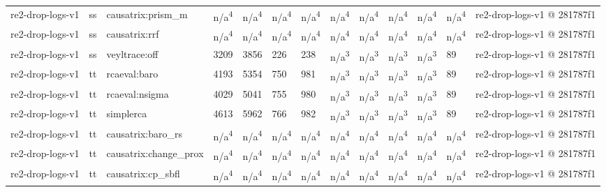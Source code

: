 \begin{table}[t]
\begin{tabular}{lllllllllllll}
re2-drop-logs-v1 & ss & causatrix:prism\_m & n/a\textsuperscript{4} & n/a\textsuperscript{4} & n/a\textsuperscript{4} & n/a\textsuperscript{4} & n/a\textsuperscript{4} & n/a\textsuperscript{4} & n/a\textsuperscript{4} & n/a\textsuperscript{4} & n/a\textsuperscript{4} & re2-drop-logs-v1 @ 281787f1 \\
re2-drop-logs-v1 & ss & causatrix:rrf & n/a\textsuperscript{4} & n/a\textsuperscript{4} & n/a\textsuperscript{4} & n/a\textsuperscript{4} & n/a\textsuperscript{4} & n/a\textsuperscript{4} & n/a\textsuperscript{4} & n/a\textsuperscript{4} & n/a\textsuperscript{4} & re2-drop-logs-v1 @ 281787f1 \\
re2-drop-logs-v1 & ss & veyltrace:off & 3209 & 3856 & 226 & 238 & n/a\textsuperscript{3} & n/a\textsuperscript{3} & n/a\textsuperscript{3} & n/a\textsuperscript{3} & 89 & re2-drop-logs-v1 @ 281787f1 \\
re2-drop-logs-v1 & tt & rcaeval:baro & 4193 & 5354 & 750 & 981 & n/a\textsuperscript{3} & n/a\textsuperscript{3} & n/a\textsuperscript{3} & n/a\textsuperscript{3} & 89 & re2-drop-logs-v1 @ 281787f1 \\
re2-drop-logs-v1 & tt & rcaeval:nsigma & 4029 & 5041 & 755 & 980 & n/a\textsuperscript{3} & n/a\textsuperscript{3} & n/a\textsuperscript{3} & n/a\textsuperscript{3} & 89 & re2-drop-logs-v1 @ 281787f1 \\
re2-drop-logs-v1 & tt & simplerca & 4613 & 5962 & 766 & 982 & n/a\textsuperscript{3} & n/a\textsuperscript{3} & n/a\textsuperscript{3} & n/a\textsuperscript{3} & 89 & re2-drop-logs-v1 @ 281787f1 \\
re2-drop-logs-v1 & tt & causatrix:baro\_rs & n/a\textsuperscript{4} & n/a\textsuperscript{4} & n/a\textsuperscript{4} & n/a\textsuperscript{4} & n/a\textsuperscript{4} & n/a\textsuperscript{4} & n/a\textsuperscript{4} & n/a\textsuperscript{4} & n/a\textsuperscript{4} & re2-drop-logs-v1 @ 281787f1 \\
re2-drop-logs-v1 & tt & causatrix:change\_prox & n/a\textsuperscript{4} & n/a\textsuperscript{4} & n/a\textsuperscript{4} & n/a\textsuperscript{4} & n/a\textsuperscript{4} & n/a\textsuperscript{4} & n/a\textsuperscript{4} & n/a\textsuperscript{4} & n/a\textsuperscript{4} & re2-drop-logs-v1 @ 281787f1 \\
re2-drop-logs-v1 & tt & causatrix:cp\_sbfl & n/a\textsuperscript{4} & n/a\textsuperscript{4} & n/a\textsuperscript{4} & n/a\textsuperscript{4} & n/a\textsuperscript{4} & n/a\textsuperscript{4} & n/a\textsuperscript{4} & n/a\textsuperscript{4} & n/a\textsuperscript{4} & re2-drop-logs-v1 @ 281787f1 \\

\end{tabular}
\end{table}
